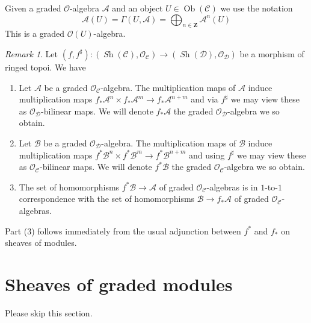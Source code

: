 \documentclass{stacks-project}
\theoremstyle{plain}
\theoremstyle{definition}
\theoremstyle{remark}
\newtheorem{remark}[subsection]{Remark}
\numberwithin{equation}{subsection}
\def\Ob{\mathop{\mathrm{Ob}}\nolimits}
\def\Sh{\mathop{\mathit{Sh}}\nolimits}
\begin{document}
\noindent
Given a graded $\mathcal{O}$-algebra $\mathcal{A}$
and an object $U \in \Ob(\mathcal{C})$ we use the notation
$$
\mathcal{A}(U) =
\Gamma(U, \mathcal{A}) =
\bigoplus\nolimits_{n \in \mathbf{Z}} \mathcal{A}^n(U)
$$
This is a graded $\mathcal{O}(U)$-algebra.

\begin{remark}
\label{remark-functoriality-ga}
Let $(f, f^\sharp) : (\Sh(\mathcal{C}), \mathcal{O}_\mathcal{C})
\to (\Sh(\mathcal{D}), \mathcal{O}_\mathcal{D})$
be a morphism of ringed topoi. We have
\begin{enumerate}
\item Let $\mathcal{A}$ be a graded $\mathcal{O}_\mathcal{C}$-algebra.
The multiplication maps of $\mathcal{A}$ induce multiplication maps
$f_*\mathcal{A}^n \times f_*\mathcal{A}^m \to f_*\mathcal{A}^{n + m}$
and via $f^\sharp$ we may view these as $\mathcal{O}_\mathcal{D}$-bilinear
maps. We will denote $f_*\mathcal{A}$ the graded
$\mathcal{O}_\mathcal{D}$-algebra we so obtain.
\item Let $\mathcal{B}$ be a graded
$\mathcal{O}_\mathcal{D}$-algebra. 
The multiplication maps of $\mathcal{B}$ induce multiplication maps
$f^*\mathcal{B}^n \times f^*\mathcal{B}^m \to f^*\mathcal{B}^{n + m}$
and using $f^\sharp$ we may view these as $\mathcal{O}_\mathcal{C}$-bilinear
maps. We will denote $f^*\mathcal{B}$
the graded $\mathcal{O}_\mathcal{C}$-algebra we so obtain.
\item The set of homomorphisms $f^*\mathcal{B} \to \mathcal{A}$
of graded $\mathcal{O}_\mathcal{C}$-algebras is in
$1$-to-$1$ correspondence with the set of homomorphisms
$\mathcal{B} \to f_*\mathcal{A}$ of graded $\mathcal{O}_\mathcal{C}$-algebras.
\end{enumerate}
Part (3) follows immediately from the usual adjunction between $f^*$ and $f_*$
on sheaves of modules.
\end{remark}




\section{Sheaves of graded modules}
\label{section-graded-modules}

\noindent
Please skip this section.
\end{document}
